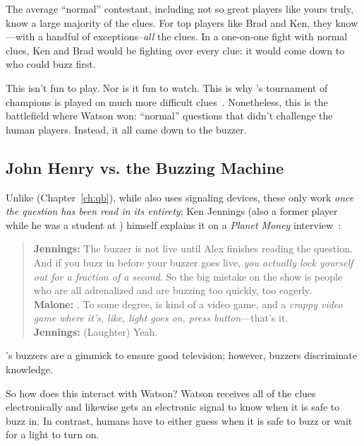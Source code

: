 The average ``normal'' \jeopardy{} contestant, including not so great
players like yours truly, know a large majority of the clues.
%
For top players like Brad and Ken, they know---with a handful of
exceptions--\emph{all} the clues.
%
In a one-on-one fight with normal clues, Ken and Brad would be
fighting over every clue: it would come down to who could buzz first.

This isn't fun to play.
%
Nor is it fun to watch.
%
This is why \jeopardyp{}'s tournament of champions is played on much
more difficult clues~\citep{harris-06}.
%
Nonetheless, this is the battlefield where Watson won: ``normal''
questions that didn't challenge the human players.
%
Instead, it all came down to the buzzer.

\subsection{John Henry vs. the Buzzing Machine}

Unlike \qb{} (Chapter~\ref{ch:qb}), while \jeopardy{} also uses
signaling devices, these only work \emph{once the question has been
  read in its entirety}; Ken Jennings (also a former \qb{} player while he was a student at
) himself explains it on a \textit{Planet Money}
interview~\citep{malone-19}:
\begin{quote}
{\bf Jennings:} The buzzer is
    not live until Alex finishes reading the question. And if you buzz
    in before your buzzer goes live, \emph{you actually lock yourself out
    for a fraction of a second}. So the big mistake on the show is
    people who are all adrenalized and are buzzing too quickly, too
    eagerly. \\
{\bf Malone:} . To some degree, \jeopardy{} is kind of a video game, and a \emph{crappy video game where it's, like, light goes on, press button}---that's it. \\
{\bf Jennings:} (Laughter) Yeah. \\
\end{quote}
\jeopardy{}'s buzzers are a gimmick to ensure good television; however, \qb{} buzzers discriminate knowledge.

So how does this interact with Watson?
%
Watson receives all of the clues electronically and likewise gets an electronic signal to know when it is safe to buzz in.
%
In contrast, humans have to either guess when it is safe to buzz or
wait for a light to turn on.


